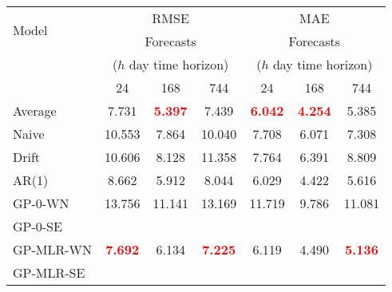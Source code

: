 \documentclass{standalone}
\begin{document}
\begin{tabular}{lcccccc}
\hline
\multirow{2}{*}{Model} & \multicolumn{3}{c}{RMSE} & \multicolumn{3}{c}{MAE} \\
\cline{2-7}
& \multicolumn{3}{c}{Forecasts} & \multicolumn{3}{c}{Forecasts} \\
& \multicolumn{3}{c}{($h$ day time horizon)} & \multicolumn{3}{c}{($h$ day time horizon)} \\
& 24 & 168 & 744 & 24 & 168 & 744 \\
\hline
Average & 7.731 & \textbf{\textcolor{red}{5.397}} & 7.439 & \textbf{\textcolor{red}{6.042}} & \textbf{\textcolor{red}{4.254}} & 5.385 \\
Naive & 10.553 & 7.864 & 10.040 & 7.708 & 6.071 & 7.308 \\
Drift & 10.606 & 8.128 & 11.358 & 7.764 & 6.391 & 8.809 \\
AR(1) & 8.662 & 5.912 & 8.044 & 6.029 & 4.422 & 5.616 \\
GP-0-WN & 13.756 & 11.141 & 13.169 & 11.719 & 9.786 & 11.081 \\
GP-0-SE & ~ & ~ & ~ & ~ & ~ & ~ \\
GP-MLR-WN & \textbf{\textcolor{red}{7.692}} & 6.134 & \textbf{\textcolor{red}{7.225}} & 6.119 & 4.490 & \textbf{\textcolor{red}{5.136}} \\
GP-MLR-SE & ~ & ~ & ~ & ~ & ~ & ~ \\
\hline
\end{tabular}
\end{document}
